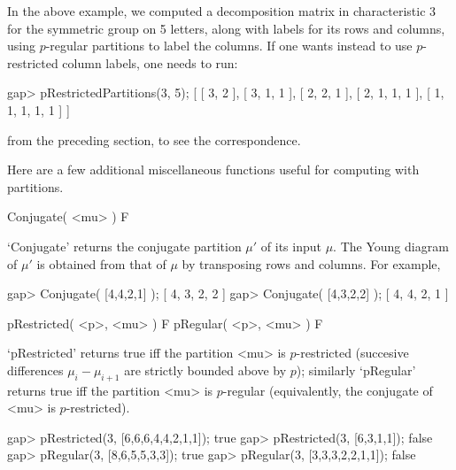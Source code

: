 In the above example, we computed a decomposition matrix in
characteristic 3 for the symmetric group on 5 letters, along with
labels for its rows and columns, using $p$-regular partitions to label
the columns. If one wants instead to use $p$-restricted column labels,
one needs to run:

\beginexample
gap> pRestrictedPartitions(3, 5);
[ [ 3, 2 ], [ 3, 1, 1 ], [ 2, 2, 1 ], [ 2, 1, 1, 1 ], [ 1, 1, 1, 1, 1 ] ]
\endexample

from the preceding section, to see the correspondence. 




Here are a few additional miscellaneous functions useful for computing
with partitions.

\>Conjugate( <mu> ) F

`Conjugate' returns the conjugate partition $\mu'$ of its input
$\mu$. The Young diagram of $\mu'$ is obtained from that of $\mu$ by
transposing rows and columns. For example,

\beginexample
gap> Conjugate( [4,4,2,1] );
[ 4, 3, 2, 2 ]
gap> Conjugate( [4,3,2,2] );
[ 4, 4, 2, 1 ]
\endexample

\>pRestricted( <p>, <mu> ) F
\>pRegular( <p>, <mu> ) F

`pRestricted' returns true iff the partition <mu> is $p$-restricted
(succesive differences $\mu_i - \mu_{i+1}$ are strictly bounded above
by $p$); similarly `pRegular' returns true iff the partition <mu> is
$p$-regular (equivalently, the conjugate of <mu> is $p$-restricted).

\beginexample
gap> pRestricted(3, [6,6,6,4,4,2,1,1]);
true
gap> pRestricted(3, [6,3,1,1]);
false
gap> pRegular(3, [8,6,5,5,3,3]);       
true
gap> pRegular(3, [3,3,3,2,2,1,1]);
false
\endexample